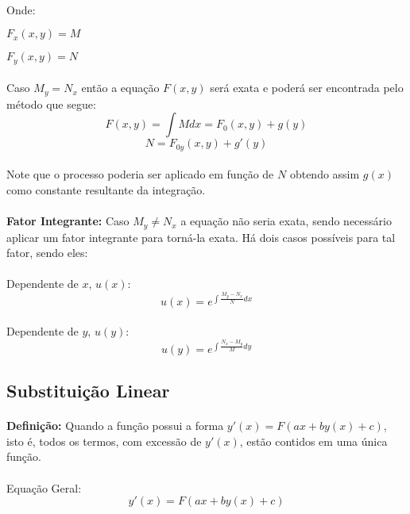 \documentclass{article}
\begin{document}
        \paragraph{}Onde:
        
        \quad$F_{x}(x,y)=M$
        
        \quad$F_{y}(x,y)=N$
        \paragraph{}Caso $M_{y}=N_{x}$ então a equação $F(x,y)$ será exata e poderá ser encontrada pelo método que segue:
            \[F(x,y)=\int{M}dx=F_{0}(x,y)+g(y)\]
            \[N= F_{0y}(x,y)+g'(y)\]
        \paragraph{}Note que o processo poderia ser aplicado em função de $N$ obtendo assim $g(x)$ como constante resultante da integração.
        \paragraph{}\textbf{Fator Integrante:} Caso $M_{y}\neq N_{x}$ a equação não seria exata, sendo necessário aplicar um fator integrante para torná-la exata. Há dois casos possíveis para tal fator, sendo eles:
        
        \paragraph{}Dependente de $x$, $u(x)$:
            \[u(x)=e^{\int{\frac{M_{y}-N_{x}}{N}dx}}\]
        \paragraph{}Dependente de $y$, $u(y)$:
            \[u(y)=e^{\int{\frac{N_{x}-M_{y}}{M}dy}}\]
    
    \subsection{Substituição Linear}
        \paragraph{}\textbf{Definição:} Quando a função possui a forma $y'(x)=F(ax+by(x)+c)$, isto é, todos os termos, com excessão de $y'(x)$, estão contidos em uma única função.
        \paragraph{}Equação Geral:
            \[y'(x)=F(ax+by(x)+c)\]
\end{document}
